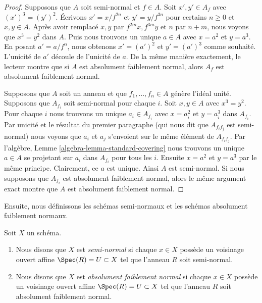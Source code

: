 \begin{proof}
Supposons que $A$ soit semi-normal et $f \in A$. Soit $x', y' \in A_f$ avec
$(x')^3 = (y')^2$. Écrivons $x' = x/f^{2n}$ et $y' = y/f^{3n}$ pour certains $n \geq 0$ et
$x, y \in A$. Après avoir remplacé $x, y$ par $f^{2m}x, f^{3m}y$ et $n$
par $n + m$, nous voyons que $x^3 = y^2$ dans $A$.
Puis nous trouvons un unique $a \in A$ avec $x = a^2$ et
$y = a^3$. En posant $a' = a/f^n$, nous obtenons $x' = (a')^2$
et $y' = (a')^3$ comme souhaité. L'unicité de $a'$ découle
de l'unicité de $a$. De la même manière
exactement, le lecteur montre que si $A$ est absolument
faiblement normal, alors $A_f$
est absolument faiblement normal.

\medskip\noindent Supposons
que $A$ soit un anneau et que $f_1, \ldots, f_n \in A$ génère l'idéal unité.
Supposons que $A_{f_i}$ soit semi-normal pour chaque
$i$. Soit $x, y \in A$ avec $x^3 = y^2$. Pour chaque $i$ nous
trouvons un unique $a_i \in A_{f_i}$ avec $x = a_i^2$ et $y = a_i^3$ dans $A_{f_i}$.
Par unicité et le résultat du premier paragraphe (qui nous dit que
$A_{f_if_j}$ est semi-normal) nous voyons que $a_i$ et
$a_j$ s'envoient sur le même élément de $A_{f_if_j}$. Par l'algèbre,
Lemme \ref{algebra-lemma-standard-covering} nous trouvons un unique $a \in A$ se
projetant sur $a_i$ dans
$A_{f_i}$ pour tous les $i$. Ensuite $x = a^2$
et $y = a^3$ par le même principe. Clairement, ce $a$ est unique.
Ainsi $A$ est semi-normal. Si nous supposons que $A_{f_i}$ est absolument faiblement normal,
alors le même argument exact montre que $A$ est absolument faiblement normal.
\end{proof}

\noindent
Ensuite, nous définissons les schémas semi-normaux et les schémas absolument faiblement normaux.

\begin{definition}
\label{definition-seminormal}
Soit $X$ un schéma.
\begin{enumerate}
\item Nous disons que $X$ est {\it semi-normal}
si chaque $x \in X$ possède un voisinage ouvert affine $\Spec(R) = U \subset X$
tel que l'anneau $R$ soit semi-normal.
\item Nous disons que $X$ est {\it absolument faiblement normal}
si chaque $x \in X$ possède un voisinage ouvert affine $\Spec(R) = U \subset X$
tel que l'anneau $R$ soit absolument faiblement normal.
\end{enumerate}
\end{definition}

